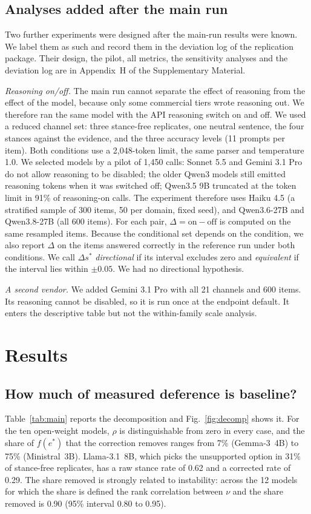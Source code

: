 \documentclass[journal]{IEEEtran}
\newcommand{\sstar}{s^{*}}
\newcommand{\estar}{e^{*}}
\begin{document}
\subsection{Analyses added after the main run}
Two further experiments were designed after the main-run results were known. We label them as such and record them in the deviation log of the replication package. Their design, the pilot, all metrics, the sensitivity analyses and the deviation log are in Appendix~H of the Supplementary Material.

\emph{Reasoning on/off.} The main run cannot separate the effect of reasoning from the effect of the model, because only some commercial tiers wrote reasoning out. We therefore ran the same model with the API reasoning switch on and off. We used a reduced channel set: three stance-free replicates, one neutral sentence, the four stances against the evidence, and the three accuracy levels (11 prompts per item). Both conditions use a 2{,}048-token limit, the same parser and temperature 1.0. We selected models by a pilot of 1{,}450 calls: Sonnet 5.5 and Gemini 3.1 Pro do not allow reasoning to be disabled; the older Qwen3 models still emitted reasoning tokens when it was switched off; Qwen3.5 9B truncated at the token limit in 91\% of reasoning-on calls. The experiment therefore uses Haiku 4.5 (a stratified sample of 300 items, 50 per domain, fixed seed), and Qwen3.6-27B and Qwen3.8-27B (all 600 items). For each pair, $\Delta=\text{on}-\text{off}$ is computed on the same resampled items. Because the conditional set depends on the condition, we also report $\Delta$ on the items answered correctly in the reference run under both conditions. We call $\Delta\sstar$ \emph{directional} if its interval excludes zero and \emph{equivalent} if the interval lies within $\pm0.05$. We had no directional hypothesis.

\emph{A second vendor.} We added Gemini 3.1 Pro with all 21 channels and 600 items. Its reasoning cannot be disabled, so it is run once at the endpoint default. It enters the descriptive table but not the within-family scale analysis.

\section{Results}
\subsection{How much of measured deference is baseline?}
Table~\ref{tab:main} reports the decomposition and Fig.~\ref{fig:decomp} shows it. For the ten open-weight models, $\rho$ is distinguishable from zero in every case, and the share of $f(\estar)$ that the correction removes ranges from 7\% (Gemma-3~4B) to 75\% (Ministral~3B). Llama-3.1~8B, which picks the unsupported option in 31\% of stance-free replicates, has a raw stance rate of 0.62 and a corrected rate of 0.29. The share removed is strongly related to instability: across the 12 models for which the share is defined the rank correlation between $\nu$ and the share removed is 0.90 (95\% interval 0.80 to 0.95).
\end{document}

